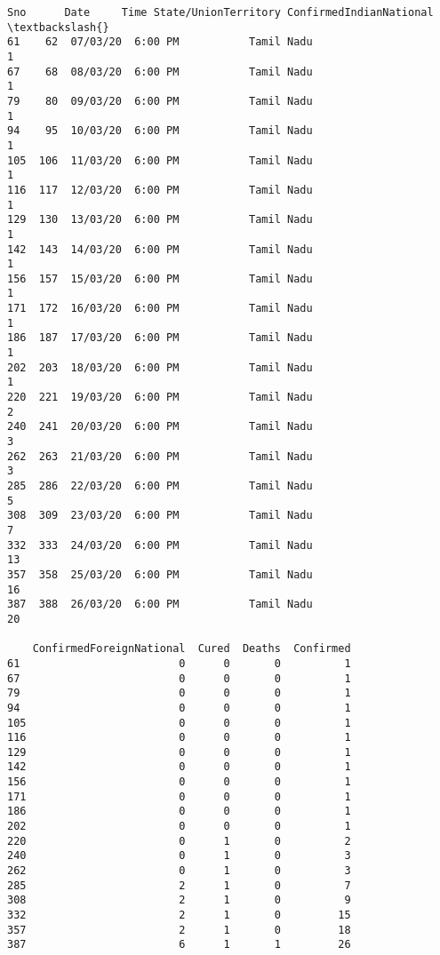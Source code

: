 \documentclass[11pt]{article}
\newcommand{\prompt}[4]{
        \llap{{\color{#2}[#3]: #4}}\vspace{-1.25em}
    }
\begin{document}
            \begin{tcolorbox}[breakable, boxrule=.5pt, size=fbox, pad at break*=1mm, opacityfill=0]
\prompt{Out}{outcolor}{7}{\hspace{3.5pt}}
\begin{Verbatim}[commandchars=\\\{\}]
     Sno      Date     Time State/UnionTerritory ConfirmedIndianNational  \textbackslash{}
61    62  07/03/20  6:00 PM           Tamil Nadu                       1
67    68  08/03/20  6:00 PM           Tamil Nadu                       1
79    80  09/03/20  6:00 PM           Tamil Nadu                       1
94    95  10/03/20  6:00 PM           Tamil Nadu                       1
105  106  11/03/20  6:00 PM           Tamil Nadu                       1
116  117  12/03/20  6:00 PM           Tamil Nadu                       1
129  130  13/03/20  6:00 PM           Tamil Nadu                       1
142  143  14/03/20  6:00 PM           Tamil Nadu                       1
156  157  15/03/20  6:00 PM           Tamil Nadu                       1
171  172  16/03/20  6:00 PM           Tamil Nadu                       1
186  187  17/03/20  6:00 PM           Tamil Nadu                       1
202  203  18/03/20  6:00 PM           Tamil Nadu                       1
220  221  19/03/20  6:00 PM           Tamil Nadu                       2
240  241  20/03/20  6:00 PM           Tamil Nadu                       3
262  263  21/03/20  6:00 PM           Tamil Nadu                       3
285  286  22/03/20  6:00 PM           Tamil Nadu                       5
308  309  23/03/20  6:00 PM           Tamil Nadu                       7
332  333  24/03/20  6:00 PM           Tamil Nadu                      13
357  358  25/03/20  6:00 PM           Tamil Nadu                      16
387  388  26/03/20  6:00 PM           Tamil Nadu                      20

    ConfirmedForeignNational  Cured  Deaths  Confirmed
61                         0      0       0          1
67                         0      0       0          1
79                         0      0       0          1
94                         0      0       0          1
105                        0      0       0          1
116                        0      0       0          1
129                        0      0       0          1
142                        0      0       0          1
156                        0      0       0          1
171                        0      0       0          1
186                        0      0       0          1
202                        0      0       0          1
220                        0      1       0          2
240                        0      1       0          3
262                        0      1       0          3
285                        2      1       0          7
308                        2      1       0          9
332                        2      1       0         15
357                        2      1       0         18
387                        6      1       1         26
\end{Verbatim}
\end{tcolorbox}
        
\end{document}
